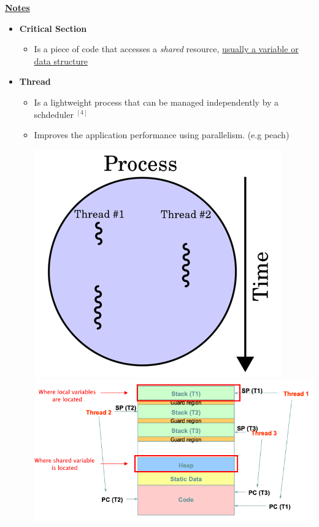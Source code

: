\documentclass[12pt]{article}
\begin{document}
\begin{enumerate}[1.]
\begin{enumerate}[a)]
        \underline{\textbf{Notes}}

        \begin{itemize}
            \item \textbf{Critical Section}

            \begin{itemize}
                \item Is a piece of code that accesses a \textit{shared} resource,
                \ul{usually a variable or data structure}
            \end{itemize}

            \item \textbf{Thread}

            \begin{itemize}
                \item Is a lightweight process that can be managed independently by a schdeduler $^{[4]}$
                \item Improves the application performance using parallelism. (e.g peach)

                \begin{center}
                \includegraphics[width=0.4\linewidth]{images/midterm_2_solution_1.png}
                \includegraphics[width=\linewidth]{images/midterm_2_solution_2.png}
                \end{center}


\end{itemize}
\end{itemize}
\end{enumerate}
\end{enumerate}
\end{document}
